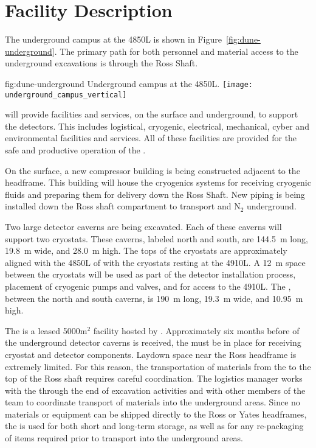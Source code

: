 \section{Facility Description}
\label{sec:es-tc-facility}

The  underground campus at the  4850L is shown in
Figure~\ref{fig:dune-underground}. The primary path for both personnel 
and material access to the underground excavations is through the Ross Shaft.
\begin{dunefigure}{fig:dune-underground}
  {Underground campus at the 4850L.}
  \texttt{[image: underground\_campus\_vertical]}
\end{dunefigure}

 will provide facilities and services, on the surface and
underground, to support the  detectors.  This includes
logistical, cryogenic, electrical, mechanical, cyber and environmental
facilities and services.  All of these facilities are provided for the
safe and productive operation of the .

On the surface, a new compressor building is being constructed
adjacent to the headframe.  This building will house the cryogenics
systems for receiving cryogenic fluids and preparing them for delivery
down the Ross Shaft.  New piping is being installed down the Ross
shaft compartment to transport  and N$_2$ underground.


Two large detector caverns
are being excavated.  Each of these caverns will support two
\larmass cryostats.  These caverns, labeled north and
south, are \SI{144.5}{\meter} long, \SI{19.8}{\meter} wide,  and 
\SI{28.0}{\meter} high. The tops of the cryostats are approximately
aligned with the 4850L of  with the cryostats resting
at the 4910L.  A \SI{12}{\meter} space between the cryostats will
be used as part of the detector installation process, placement of
cryogenic pumps and valves, and for access to the 4910L.  The
, between the north and south caverns, is \SI{190}{\meter}
long, \SI{19.3}{\meter} wide, and \SI{10.95}{\meter} high. 

The  is a leased 5000m$^2$ facility hosted by 
.  Approximately six months before 
of the underground detector caverns is received, the  
must be in place for receiving cryostat and detector 
components.  Laydown space near the Ross headframe is extremely 
limited.  For this reason, the transportation of materials from 
the  to the top of the Ross shaft requires careful 
coordination. The  logistics manager works 
with the  through the end of excavation activities  
and with other members of the  team to coordinate transport 
of materials into the underground areas.  Since no materials or 
equipment can be shipped directly to the Ross or Yates headframes, 
the  is used for both short and long-term storage, as 
well as for any re-packaging of items required prior to transport 
into the underground areas. 

